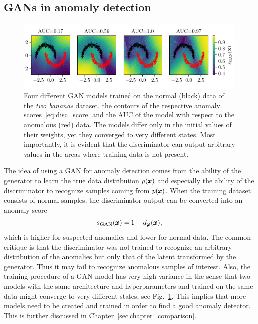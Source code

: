 \subsection{GANs in anomaly detection} \label{sec:gan_survey}
\begin{figure}
\begin{centering}
\includegraphics[scale=0.98]{data/chapter_survey/gan_examples.pdf}
\end{centering}
\caption{Four different GAN models trained on the normal (black) data of the \textit{two bananas} dataset, the contours of the respective anomaly scores~\eqref{eq:disc_score} and the AUC of the model with respect to the anomalous (red) data. The models differ only in the initial values of their weights, yet they converged to very different states. Most importantly, it is evident that the discriminator can output arbitrary values in the areas where training data is not present.}
\label{fig:gan_examples}
\end{figure}

The idea of using a GAN for anomaly detection comes from the ability of the generator to learn the true data distribution $p(\pmb{{x}})$ and especially the ability of the discriminator to recognize samples coming from $p(\pmb{{x}})$. When the training dataset consists of normal samples, the discriminator output can be converted into an anomaly score
\begin{equation} \label{eq:disc_score}
     s_{\text{GAN}}(\pmb{{x}}) = 1 - d_{\pmb{{\varphi}}}(\pmb{{x}}),
\end{equation}
which is higher for suspected anomalies and lower for normal data. The common critique is that the discriminator was not trained to recognize an arbitrary distribution of the anomalies but only that of the latent transformed by the generator. Thus it may fail to recognize anomalous samples of interest. Also, the training procedure of a GAN model has very high variance in the sense that two models with the same architecture and hyperparameters and trained on the same data might converge to very different states, see Fig.~\ref{fig:gan_examples}. This implies that more models need to be created and trained in order to find a good anomaly detector. This is further discussed in Chapter~\ref{sec:chapter_comparison}.

